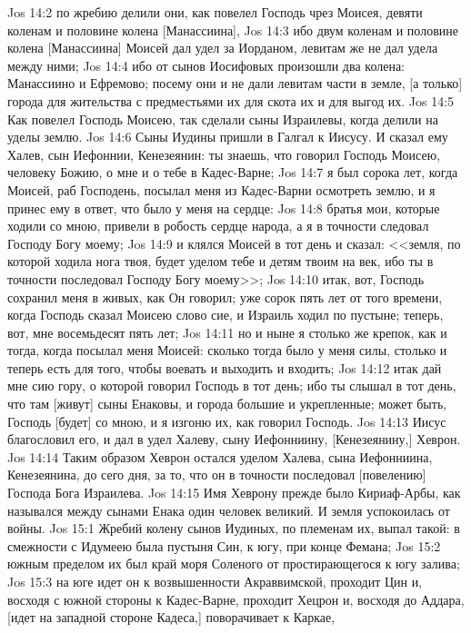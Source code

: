 \vs Jos 14:2 по жребию делили они, как повелел Господь чрез Моисея, девяти коленам и половине колена [Манассиина],
\vs Jos 14:3 ибо двум коленам и половине колена [Манассиина] Моисей дал удел за Иорданом, левитам же не дал удела между ними;
\vs Jos 14:4 ибо от сынов Иосифовых произошли два колена: Манассиино и Ефремово; посему они и не дали левитам части в земле, [а только] города для жительства с предместьями их для скота их и для  выгод их.
\vs Jos 14:5 Как повелел Господь Моисею, так  сделали сыны Израилевы, когда делили на уделы землю.
\vs Jos 14:6 Сыны Иудины пришли в Галгал к Иисусу. И сказал ему Халев, сын Иефоннии, Кенезеянин: ты знаешь, что говорил Господь Моисею, человеку Божию, о мне и о тебе в Кадес-Варне;
\vs Jos 14:7 я был сорока лет, когда Моисей, раб Господень, посылал меня из Кадес-Варни осмотреть землю, и я принес ему в ответ, что было у меня на сердце:
\vs Jos 14:8 братья мои, которые ходили со мною, привели в робость сердце народа, а я в точности следовал Господу Богу моему;
\vs Jos 14:9 и клялся Моисей в тот день и сказал: <<земля, по которой ходила нога твоя, будет уделом тебе и детям твоим на век, ибо ты в точности последовал Господу Богу моему>>;
\vs Jos 14:10 итак, вот, Господь сохранил меня в живых, как Он говорил; уже сорок пять лет  от того времени, когда Господь сказал Моисею слово сие, и Израиль ходил по пустыне; теперь, вот, мне восемьдесят пять лет;
\vs Jos 14:11 но и ныне я столько же крепок, как и тогда, когда посылал меня Моисей: сколько тогда было у меня силы, столько и теперь есть для того, чтобы воевать и выходить и входить;
\vs Jos 14:12 итак дай мне сию гору, о которой говорил Господь в тот день; ибо ты слышал в тот день, что там [живут] сыны Енаковы, и города  большие и укрепленные; может быть, Господь [будет] со мною, и я изгоню их, как говорил Господь.
\vs Jos 14:13 Иисус благословил его, и дал в удел Халеву, сыну Иефонниину, [Кенезеянину,] Хеврон.
\vs Jos 14:14 Таким образом Хеврон остался уделом Халева, сына Иефонниина, Кенезеянина, до сего дня, за то, что он в точности последовал [повелению] Господа Бога Израилева.
\vs Jos 14:15 Имя Хеврону прежде было Кириаф-Арбы, как назывался между сынами Енака один человек великий. И земля успокоилась от войны.
\vs Jos 15:1 Жребий колену сынов Иудиных, по племенам их, выпал такой: в смежности с Идумеею была пустыня Син, к югу, при конце Фемана;
\vs Jos 15:2 южным пределом их был край моря Соленого от простирающегося к югу залива;
\vs Jos 15:3 на юге идет он к возвышенности Акраввимской, проходит Цин и, восходя с южной стороны к Кадес-Варне, проходит Хецрон и, восходя до Аддара, [идет на западной стороне Кадеса,] поворачивает к Каркае,
